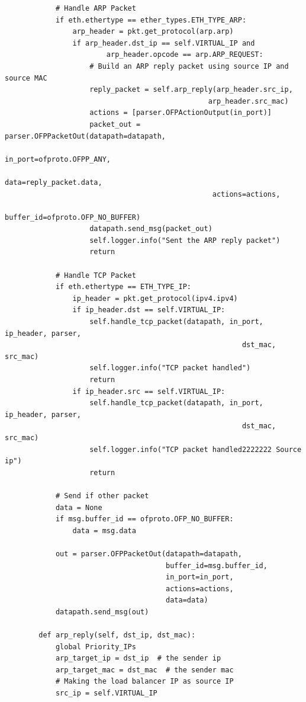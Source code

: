 \documentclass[a4paper,12pt]{article}
\begin{document}
\begin{verbatim}
            # Handle ARP Packet
            if eth.ethertype == ether_types.ETH_TYPE_ARP:
                arp_header = pkt.get_protocol(arp.arp)
                if arp_header.dst_ip == self.VIRTUAL_IP and
                        arp_header.opcode == arp.ARP_REQUEST:
                    # Build an ARP reply packet using source IP and source MAC
                    reply_packet = self.arp_reply(arp_header.src_ip, 
                                                arp_header.src_mac)
                    actions = [parser.OFPActionOutput(in_port)]
                    packet_out = parser.OFPPacketOut(datapath=datapath,
                                                 in_port=ofproto.OFPP_ANY,
                                                 data=reply_packet.data,
                                                 actions=actions,
                                                 buffer_id=ofproto.OFP_NO_BUFFER)
                    datapath.send_msg(packet_out)
                    self.logger.info("Sent the ARP reply packet")
                    return
    
            # Handle TCP Packet
            if eth.ethertype == ETH_TYPE_IP:
                ip_header = pkt.get_protocol(ipv4.ipv4)
                if ip_header.dst == self.VIRTUAL_IP:
                    self.handle_tcp_packet(datapath, in_port, ip_header, parser,
                                                        dst_mac, src_mac)
                    self.logger.info("TCP packet handled")
                    return
                if ip_header.src == self.VIRTUAL_IP:
                    self.handle_tcp_packet(datapath, in_port, ip_header, parser,
                                                        dst_mac, src_mac)
                    self.logger.info("TCP packet handled2222222 Source ip")
                    return
    
            # Send if other packet
            data = None
            if msg.buffer_id == ofproto.OFP_NO_BUFFER:
                data = msg.data
    
            out = parser.OFPPacketOut(datapath=datapath,
                                      buffer_id=msg.buffer_id,
                                      in_port=in_port,
                                      actions=actions,
                                      data=data)
            datapath.send_msg(out)
    
        def arp_reply(self, dst_ip, dst_mac):
            global Priority_IPs
            arp_target_ip = dst_ip  # the sender ip
            arp_target_mac = dst_mac  # the sender mac
            # Making the load balancer IP as source IP
            src_ip = self.VIRTUAL_IP
    

\end{verbatim}
\end{document}
